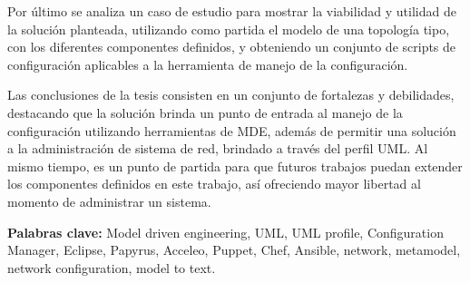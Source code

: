 Por último se analiza un caso de estudio para mostrar la viabilidad y utilidad de la solución planteada, utilizando como partida el modelo de una topología tipo, con los diferentes componentes definidos, y obteniendo un conjunto de scripts de configuración aplicables a la herramienta de manejo de la   configuración.

Las conclusiones de la tesis consisten en un conjunto de fortalezas y debilidades, destacando que la solución brinda un punto de entrada al manejo de la configuración utilizando herramientas de MDE, además de permitir una solución a la administración de sistema de red, brindado a través del perfil UML. Al mismo tiempo, es un punto de partida para que futuros trabajos puedan extender los componentes definidos en este trabajo, así ofreciendo mayor libertad al momento de administrar un sistema.

\textbf{Palabras clave:} Model driven engineering, UML, UML profile, Configuration Manager, Eclipse, Papyrus, Acceleo, Puppet, Chef, Ansible, network, metamodel, network configuration, model to text.